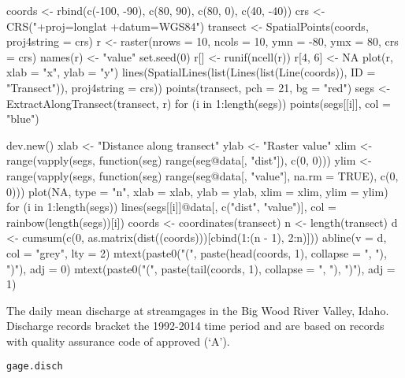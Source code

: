 \documentclass[letterpaper]{book}
\begin{document}
\begin{Examples}
\begin{ExampleCode}
coords <- rbind(c(-100, -90), c(80, 90), c(80, 0), c(40, -40))
crs <- CRS("+proj=longlat +datum=WGS84")
transect <- SpatialPoints(coords, proj4string = crs)
r <- raster(nrows = 10, ncols = 10, ymn = -80, ymx = 80, crs = crs)
names(r) <- "value"
set.seed(0)
r[] <- runif(ncell(r))
r[4, 6] <- NA
plot(r, xlab = "x", ylab = "y")
lines(SpatialLines(list(Lines(list(Line(coords)), ID = "Transect")), proj4string = crs))
points(transect, pch = 21, bg = "red")
segs <- ExtractAlongTransect(transect, r)
for (i in 1:length(segs)) points(segs[[i]], col = "blue")

dev.new()
xlab <- "Distance along transect"
ylab <- "Raster value"
xlim <- range(vapply(segs, function(seg) range(seg@data[, "dist"]), c(0, 0)))
ylim <- range(vapply(segs, function(seg) range(seg@data[, "value"], na.rm = TRUE),
                     c(0, 0)))
plot(NA, type = "n", xlab = xlab, ylab = ylab, xlim = xlim, ylim = ylim)
for (i in 1:length(segs))
  lines(segs[[i]]@data[, c("dist", "value")], col = rainbow(length(segs))[i])
coords <- coordinates(transect)
n <- length(transect)
d <- cumsum(c(0, as.matrix(dist((coords)))[cbind(1:(n - 1), 2:n)]))
abline(v = d, col = "grey", lty = 2)
mtext(paste0("(", paste(head(coords, 1), collapse = ", "), ")"), adj = 0)
mtext(paste0("(", paste(tail(coords, 1), collapse = ", "), ")"), adj = 1)
\end{ExampleCode}
\end{Examples}
%
\begin{Description}\relax
The daily mean discharge at streamgages in the Big Wood River Valley, Idaho.
Discharge records bracket the 1992-2014 time period and are based on records with quality assurance code of approved (`A').
\end{Description}
%
\begin{Usage}
\begin{verbatim}
gage.disch
\end{verbatim}
\end{Usage}
%
\end{document}
